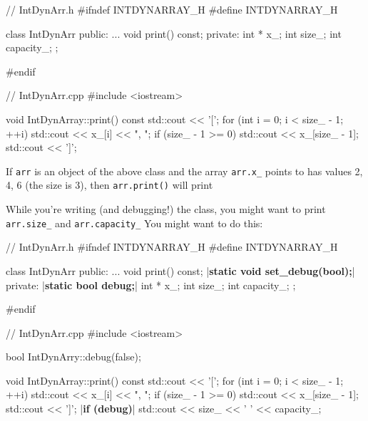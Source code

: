 \begin{consolethree}[escapeinside=||]
// IntDynArr.h
#ifndef INTDYNARRAY_H
#define INTDYNARRAY_H

class IntDynArr
{
public:
    ...
    void print() const;
private:
    int * x_;
    int size_;
    int capacity_;
};

#endif
\end{consolethree}

\begin{consolethree}[escapeinside=||]
// IntDynArr.cpp
#include <iostream>

void IntDynArray::print() const
{
    std::cout << '[';
    for (int i = 0; i < size_ - 1; ++i)
    {
        std::cout << x_[i] << ", ";
    }
    if (size_ - 1 >= 0)
    {
        std::cout << x_[size_ - 1];
    }
    std::cout << ']';
}
\end{consolethree}

If \texttt{arr} is an object of the above class and the array
\texttt{arr.x\_} points to has values 2, 4, 6 (the size is 3), then
\texttt{arr.print()} will print

\begin{consolethree}[escapeinside=||]
[2, 4, 6]
\end{consolethree}

While you're writing (and debugging!) the class, you
might want to print \texttt{arr.size\_} and \texttt{arr.capacity\_} You
might want to do this:

\begin{consolethree}[escapeinside=||]
// IntDynArr.h
#ifndef INTDYNARRAY_H
#define INTDYNARRAY_H

class IntDynArr
{
public:
    ...
    void print() const;
    |{\bf static void set\_debug(bool);}|
private:
    |{\bf static bool debug;}|
    int * x_;
    int size_;
    int capacity_;
};

#endif
\end{consolethree}

\begin{consolethree}[escapeinside=||]
// IntDynArr.cpp
#include <iostream>

bool IntDynArry::debug(false);

void IntDynArray::print() const
{
    std::cout << '[';
    for (int i = 0; i < size_ - 1; ++i)
    {
        std::cout << x_[i] << ", ";
    }
    if (size_ - 1 >= 0)
    {
        std::cout << x_[size_ - 1];
    }
    std::cout << ']';
    |{\bf if (debug)}|
    {
        std::cout << size_ << ' '
                  << capacity_;
    }
}
\end{consolethree}


